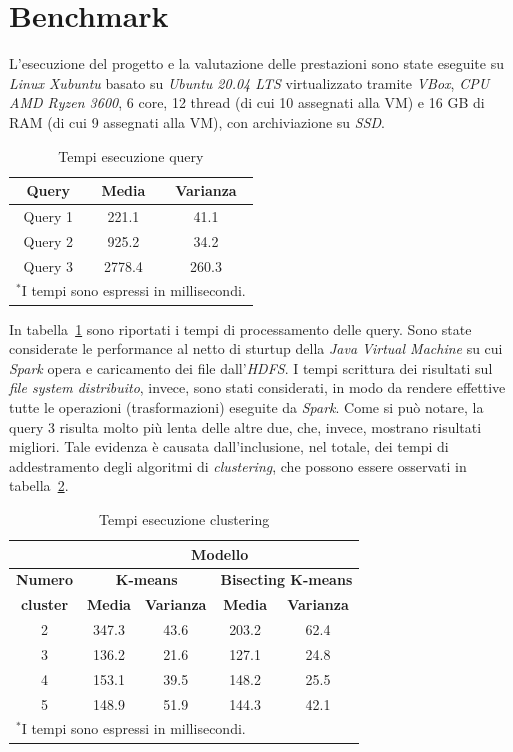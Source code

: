 \documentclass[conference]{IEEEtran}
\begin{document}
\section{\textbf{Benchmark}}
L'esecuzione del progetto e la valutazione delle prestazioni sono state eseguite su \emph{Linux Xubuntu} basato su \emph{Ubuntu 20.04 LTS} virtualizzato tramite \emph{VBox}, \emph{CPU AMD Ryzen 3600}, 6 core, 12 thread (di cui 10 assegnati alla VM) e 16 GB di RAM (di cui 9 assegnati alla VM), con archiviazione su \emph{SSD}. \\
\begin{table}[htbp]
\caption{Tempi esecuzione query}
\begin{center}
    \begin{tabular}{|c|c|c|}
    \hline
    \textbf{Query} & \textbf{Media} & \textbf{Varianza}  \\ \hline
    Query 1 & 221.1 & 41.1  \\ \hline
    Query 2 & 925.2 & 34.2 \\ \hline
    Query 3 & 2778.4 & 260.3 \\ \hline
    \multicolumn{3}{l}{$^{\mathrm{*}}$I tempi sono espressi in millisecondi.}
    \end{tabular}
\label{tab1}
\end{center}
\end{table}
\par In tabella~\ref{tab1} sono riportati i tempi di processamento delle query. Sono state considerate le performance al netto di sturtup della \emph{Java Virtual Machine} su cui \emph{Spark} opera e caricamento dei file dall'\emph{HDFS}. I tempi scrittura dei risultati sul \emph{file system distribuito}, invece, sono stati considerati, in modo da rendere effettive tutte le operazioni (trasformazioni) eseguite da \emph{Spark}. Come si pu\`{o} notare, la query 3 risulta molto pi\`{u} lenta delle altre due, che, invece, mostrano risultati migliori. Tale evidenza \`{e} causata dall'inclusione, nel totale, dei tempi di addestramento degli algoritmi di \emph{clustering}, che possono essere osservati in tabella~\ref{tab2}.
\begin{table}[htbp]
\caption{Tempi esecuzione clustering}
\begin{center}
\begin{tabular}{|c|c|c|c|c|}
\hline
\textbf{}&\multicolumn{4}{|c|}{\textbf{Modello}} \\ \hline
\textbf{Numero} & \multicolumn{2}{|c|}{\textbf{K-means}} & \multicolumn{2}{|c|}{\textbf{Bisecting K-means}} \\ \cline{2-5} 
\textbf{cluster} & \textbf{Media} & \textbf{Varianza} & \textbf{Media} & \textbf{Varianza} \\ \hline
2 & 347.3 & 43.6 & 203.2 & 62.4 \\ \hline
3 & 136.2 & 21.6 & 127.1 & 24.8 \\ \hline
4 & 153.1 & 39.5 & 148.2 & 25.5 \\ \hline
5 & 148.9 & 51.9 & 144.3 & 42.1 \\ \hline
\multicolumn{5}{l}{$^{\mathrm{*}}$I tempi sono espressi in millisecondi.}
\end{tabular}
\label{tab2}
\end{center}
\end{table}
\end{document}
